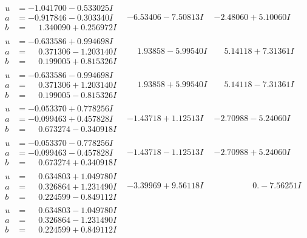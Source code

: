 \documentclass[1p]{elsarticle_modified}
\theoremstyle{definition}
\begin{document}
$$\begin{array}{c|c|c}
\begin{aligned}
u &= -1.041700 - 0.533025 I \\
a &= -0.917846 - 0.303340 I \\
b &= \phantom{-}1.340090 + 0.256972 I\end{aligned}
 & -6.53406 - 7.50813 I & -2.48060 + 5.10060 I \\ \hline\begin{aligned}
u &= -0.633586 + 0.994698 I \\
a &= \phantom{-}0.371306 - 1.203140 I \\
b &= \phantom{-}0.199005 + 0.815326 I\end{aligned}
 & \phantom{-}1.93858 - 5.99540 I & \phantom{-}5.14118 + 7.31361 I \\ \hline\begin{aligned}
u &= -0.633586 - 0.994698 I \\
a &= \phantom{-}0.371306 + 1.203140 I \\
b &= \phantom{-}0.199005 - 0.815326 I\end{aligned}
 & \phantom{-}1.93858 + 5.99540 I & \phantom{-}5.14118 - 7.31361 I \\ \hline\begin{aligned}
u &= -0.053370 + 0.778256 I \\
a &= -0.099463 + 0.457828 I \\
b &= \phantom{-}0.673274 - 0.340918 I\end{aligned}
 & -1.43718 + 1.12513 I & -2.70988 - 5.24060 I \\ \hline\begin{aligned}
u &= -0.053370 - 0.778256 I \\
a &= -0.099463 - 0.457828 I \\
b &= \phantom{-}0.673274 + 0.340918 I\end{aligned}
 & -1.43718 - 1.12513 I & -2.70988 + 5.24060 I \\ \hline\begin{aligned}
u &= \phantom{-}0.634803 + 1.049780 I \\
a &= \phantom{-}0.326864 + 1.231490 I \\
b &= \phantom{-}0.224599 - 0.849112 I\end{aligned}
 & -3.39969 + 9.56118 I & \phantom{-0.000000 } 0. - 7.56251 I \\ \hline\begin{aligned}
u &= \phantom{-}0.634803 - 1.049780 I \\
a &= \phantom{-}0.326864 - 1.231490 I \\
b &= \phantom{-}0.224599 + 0.849112 I\end{aligned}

\end{array}$$
\end{document}
